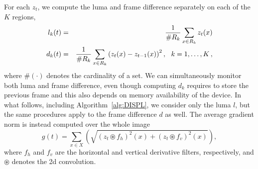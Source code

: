 \documentclass{llncs}
\begin{document}
For each $z_t$, we compute the luma and frame difference separately on each of the $K$ regions,
\begin{eqnarray}
\vspace{-0.5cm}
l_k(t) &=& \frac{1}{\#R_k} \sum_{x \in R_k} z_t(x) \label{eq:lumaRegions}\\
d_k(t) &=&\frac{1}{\#R_k} \sum_{x \in R_k} \left(z_t(x) - z_{t-1}(x) \right)^2, \ \ k = 1, \dots, K\,,\label{eq:FDRegions}
\vspace{-0.5cm}
\end{eqnarray}
where $\#(\cdot)$ denotes the cardinality of a set. We can simultaneously monitor both luma and frame difference, even though computing $d_k$ requires to store the previous frame and this also depends on memory availability of the device. In what follows, including Algorithm~\ref{alg:DISPL}, we consider only the luma $l$, but the same procedures apply to the frame difference $d$ as well. The average gradient norm is instead computed over the whole image
\begin{equation}
\label{eq:normaGradiente}
g(t) = \sum_{x \in X} \left (\sqrt{\left(z_t \circledast f_h\right)^2(x) + \left(z_t \circledast f_v\right)^2(x)}\right),
\end{equation}
where $f_h$ and $f_v$ are the horizontal and vertical derivative filters, respectively, and $\circledast$ denotes the 2d convolution. 
\end{document}
